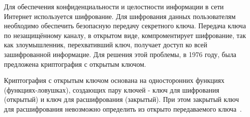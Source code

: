 \documentclass[times,specification,annotation]{itmo-student-thesis}
\begin{document}





\tableofcontents

\startprefacepage

Для обеспечения конфиденциальности и целостности информации в сети Интернет используется шифрование.
Для шифрования данных пользователям необходимо обеспечить безопасную передачу секретного ключа.
Передача ключа по незащищённому каналу, в открытом виде, компроментирует шифрование, так как
злоумышленник, перехвативший ключ, получает доступ ко всей зашифрованной информацие.
Для решения этой проблемы, в 1976 году, была предложена  криптография с открытым ключом.

Криптография с открытым ключом основана на односторонних функциях (функциях-ловушках),
создающих пару ключей - ключ для шифрования (открытый) и ключ для расшифрования (закрытый).
При этом закрытый ключ для расшифрования  невозможно определить из открыто передаваемого ключа~\cite{dif77}.
\end{document}
